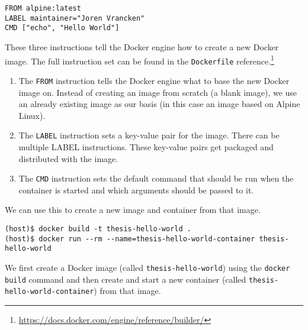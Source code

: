 \begin{lstlisting}[caption={A basic \lstinline{Dockerfile}.},label={listing:dockerfile-simple},captionpos=b]
FROM alpine:latest
LABEL maintainer="Joren Vrancken"
CMD ["echo", "Hello World"]
\end{lstlisting}

These three instructions tell the Docker engine how to create a new Docker image.
The full instruction set can be found in the \lstinline{Dockerfile} reference.\footnote{\url{https://docs.docker.com/engine/reference/builder/}}

\begin{enumerate}
    \item The \lstinline{FROM} instruction tells the Docker engine what to base the new Docker image on. Instead of creating an image from scratch (a blank image), we use an already existing image as our basis (in this case an image based on Alpine Linux).

    \item The \lstinline{LABEL} instruction sets a key-value pair for the image. There can be multiple LABEL instructions. These key-value pairs get packaged and distributed with the image.

    \item The \lstinline{CMD} instruction sets the default command that should be run when the container is started and which arguments should be passed to it.
\end{enumerate}

We can use this to create a new image and container from that image.
\begin{lstlisting}[caption={Creating a Docker container from a \lstinline{Dockerfile}.},label={listing:create-container},captionpos=b]
(host)$ docker build -t thesis-hello-world .
(host)$ docker run --rm --name=thesis-hello-world-container thesis-hello-world
\end{lstlisting}

We first create a Docker image (called \lstinline{thesis-hello-world}) using the \lstinline{docker build} command and then create and start a new container (called \lstinline{thesis-hello-world-container}) from that image.

